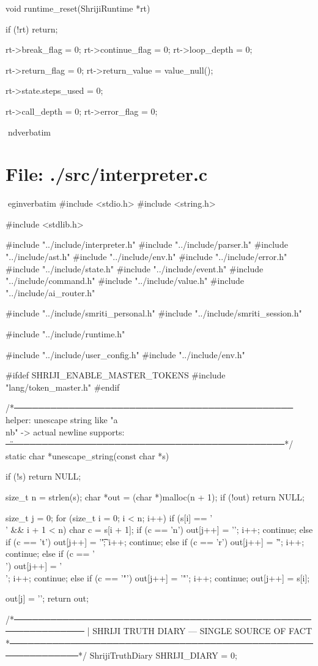 \documentclass{article}
\begin{document}
void runtime_reset(ShrijiRuntime *rt)
{
    if (!rt) return;

    rt->break_flag = 0;
    rt->continue_flag = 0;
    rt->loop_depth = 0;

    rt->return_flag = 0;
    rt->return_value = value_null();

    rt->state.steps_used = 0;

    rt->call_depth = 0;
    rt->error_flag = 0;
}
nd{verbatim}
\section*{File: ./src/interpreter.c}
egin{verbatim}
#include <stdio.h>
#include <string.h>

#include <stdlib.h>

#include "../include/interpreter.h"
#include "../include/parser.h"
#include "../include/ast.h"
#include "../include/env.h"
#include "../include/error.h"
#include "../include/state.h"
#include "../include/event.h"
#include "../include/command.h"
#include "../include/value.h"
#include "../include/ai_router.h"

#include "../include/smriti_personal.h"
#include "../include/smriti_session.h"

#include "../include/runtime.h"

#include "../include/user_config.h"
#include "../include/env.h"

#ifdef SHRIJI_ENABLE_MASTER_TOKENS
#include "lang/token_master.h"
#endif

/*──────────────────────────────────────────────
  helper: unescape string like "a\\nb" -> actual newline
  supports: \n \t \r \\ \"
──────────────────────────────────────────────*/
static char *unescape_string(const char *s)
{
    if (!s) return NULL;

    size_t n = strlen(s);
    char *out = (char *)malloc(n + 1);
    if (!out) return NULL;

    size_t j = 0;
    for (size_t i = 0; i < n; i++) {
        if (s[i] == '\\' && i + 1 < n) {
            char c = s[i + 1];
            if (c == 'n')      { out[j++] = '\n'; i++; continue; }
            else if (c == 't') { out[j++] = '\t'; i++; continue; }
            else if (c == 'r') { out[j++] = '\r'; i++; continue; }
            else if (c == '\\'){ out[j++] = '\\'; i++; continue; }
            else if (c == '"') { out[j++] = '"';  i++; continue; }
        }
        out[j++] = s[i];
    }

    out[j] = '\0';
    return out;
}
/*──────────────────────────────────────────────────────────────
 | SHRIJI TRUTH DIARY — SINGLE SOURCE OF FACT
 *──────────────────────────────────────────────────────────────*/
ShrijiTruthDiary SHRIJI_DIARY = {0};
\end{document}
